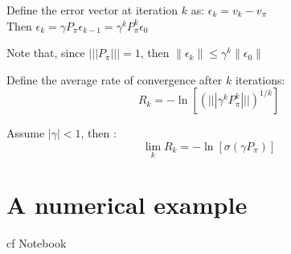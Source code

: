 \documentclass{beamer}
\begin{document}
	    \begin{frame}
	    	\begin{definition}
		    	Define the error vector at iteration $k$ as: $\epsilon_{k} = v_{k}-v_{\pi}$\\
		    	Then $\epsilon_{k} = \gamma P_{\pi} \epsilon_{k-1} = \gamma^{k} P_{\pi}^{k} \epsilon_{0}$
	    	\end{definition}
	    	
	    	Note that, since $||| P_{\pi} ||| = 1$, then $\| \epsilon_{k} \| \leq \gamma^{k} \| \epsilon_{0} \|	$
	    	\begin{definition}
		    	Define the average rate of convergence after $k$ iterations:
		    	\[
					R_{k} = - \ln \left[ ( |||\gamma^{k} P_{\pi}^{k} ||| )^{1/k} \right]    	
		    	\]
	    	\end{definition}
	    	\begin{theorem}
	    		Assume $|\gamma| < 1$, then :
	    		\[
					\lim_{k} R_{k} = - \ln \left[ \sigma(\gamma P_{\pi}) \right]
	    		\]
	    	\end{theorem}
	    	
	    \end{frame}

\section{A numerical example}
	\begin{frame}
		cf Notebook
	\end{frame}
\end{document}
